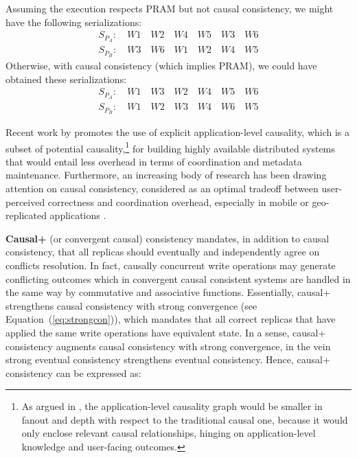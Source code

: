 \documentclass[letter, 11pt]{article}
\newcommand{\citeN}{\citet}
\renewcommand{\cite}{\citep}
\begin{document}
\noindent Assuming the execution respects PRAM but not causal consistency, we might have the following serializations:
\begin{align} 
S_{P_{A}} : \quad W1 \quad W2 \quad W4 \quad W5 \quad W3 \quad W6 \tag{S.6}\\ 
S_{P_{B}} : \quad W3 \quad W6 \quad W1 \quad W2 \quad W4 \quad W5 \tag{S.7}
\end{align}
Otherwise, with causal consistency (which implies PRAM), we could have obtained these serializations:
\begin{align} 
S_{P_{A}} : \quad W1 \quad W3 \quad W2 \quad W4 \quad W5 \quad W6 \tag{S.8}\\ 
S_{P_{B}} : \quad W1 \quad W2 \quad W3 \quad W4 \quad W6 \quad W5 \tag{S.9}
\end{align}

Recent work by \citeN{Bailis.Fekete.ea:12} promotes the use of explicit application-level causality, 
which is a subset of potential causality,\footnote{As argued in \cite{Bailis.Fekete.ea:12},
the application-level causality graph would be smaller in fanout and depth with respect to 
the traditional causal one, because it would only enclose relevant causal relationships, 
hinging on application-level knowledge and user-facing outcomes.}
for building highly available distributed systems that would entail less overhead
in terms of coordination and metadata maintenance.
Furthermore, an increasing body of research has been drawing attention on causal consistency, considered
as an optimal tradeoff between user-perceived correctness and coordination overhead,
especially in mobile or geo-replicated applications \cite{Lloyd.Freedman.ea:11,Bailis.Ghodsi.ea:13,Zawirski.ea:15}. 

\textbf{Causal+} (or convergent causal) consistency \cite{Lloyd.Freedman.ea:11} mandates, 
in addition to causal consistency, 
that all replicas should eventually and independently agree on conflicts resolution.
In fact, causally concurrent write operations may generate conflicting outcomes
which in convergent causal consistent systems are handled in the same way by commutative and associative functions.
Essentially, causal+ strengthens causal consistency with strong convergence (see Equation~(\ref{eq:strongcon})), which mandates that all correct replicas that have applied the same write operations have equivalent state. In a sense, causal+ consistency augments causal consistency with strong convergence, in the vein strong eventual consistency \cite{Shapiro.ea:11} strengthens eventual consistency. Hence, causal+ consistency can be expressed as:
\end{document}
